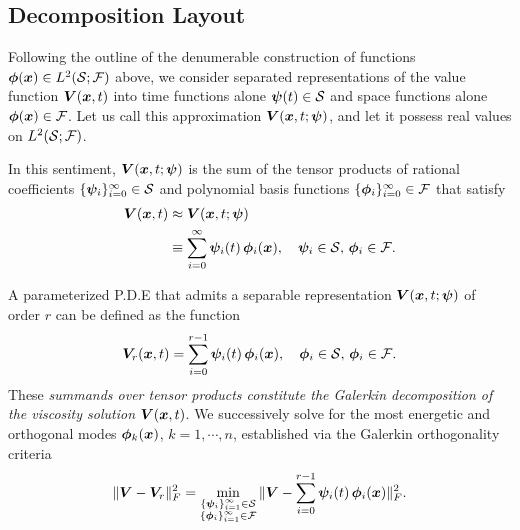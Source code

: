 \subsection{Decomposition Layout}
%
\noindent %
 Following the outline of the denumerable construction of functions $\bm{\phi}(\bm{x}) \in L^2({\mathcal{S}}; \mathcal{F})$ above, we consider separated representations of the value function $\bm{V} (\bm{x},t)$  into time functions alone \ie $\bm{\psi}(t) \in \mathcal{S}$ and space functions alone \ie $\bm{\phi}(\bm{x}) \in \mathcal{F}$. Let us call this approximation  $\bm{V} (\bm{x},t; \bm{\psi})$, and let it possess real values on  $L^2(\mathcal{S}; \mathcal{F})$. %

In this sentiment, $\bm{V} (\bm{x},t; \bm{\psi})$ is the sum of the tensor products of rational coefficients $\{\bm{\psi}_i\}_{i=0}^\infty \in \mathcal{S}$ and polynomial basis functions $\{\bm{\phi}_i\}_{i=0}^\infty \in \mathcal{F}$ that satisfy
%
\begin{subequations}
	\begin{align}
		\bm{V}(\bm{x}, t) &\approx \bm{V}(\bm{x}, t; \bm{\psi}) \\
		&\equiv \sum_{i=0}^\infty  \bm{\psi}_i(t) \, \bm{\phi}_i(\bm{x}), \quad \bm{\psi}_i \in  \mathcal{S}, \, \bm{\phi}_i \in \mathcal{F}.
	\end{align} 
	\label{eq:decomp_general}
\end{subequations}
%

A parameterized P.D.E that admits a separable representation $\bm{V}(\bm{x}, t; \bm{\psi})$ of order $r$ can be defined as the function
%
\begin{align}
	\valuefunc_r(\state, t) = \sum_{i=0}^{r-1}  \hilbertcoeff_i(t) \, \hilbertparam_i(\bm{x}), \quad \hilbertparam_i \in   \mathcal{S}, \, \hilbertparam_i \in \mathcal{F}.
	\label{eq:decomp_reduced}
\end{align} 
% 
These \textit{summands over tensor products constitute the Galerkin decomposition of the viscosity solution} $\bm{V} (\bm{x},t)$. %
We successively solve for the most energetic and orthogonal modes $\bm{\phi}_k(\bm{x})$, $k=1, \cdots, n$, established  via the Galerkin orthogonality criteria 
%
\begin{align}
	\| \valuefunc - \valuefunc_r \|^2_{F} = \min_{\substack{\{\hilbertcoeff_i\}_{i=1}^\infty \in \mathcal{S} \\ \{\hilbertparam_i\}_{i=1}^\infty \in \mathcal{F} }} \|\valuefunc - \sum_{i=0}^{r-1}  \hilbertcoeff_i(t)\, \hilbertparam_i(\state) \|_F^2.
	\label{eq:galerk_orth_crit_reduced}
\end{align}

